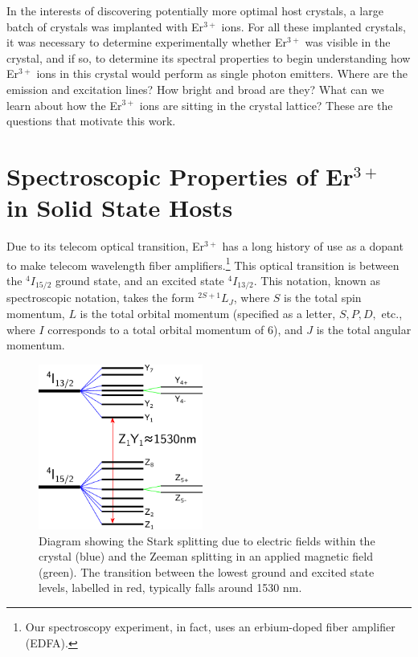 \documentclass[12pt]{puthesis}
\newcommand{\erbium}[1][ ]{Er$^{3+}$#1}
\begin{document}
In the interests of discovering potentially more optimal host crystals, a large batch of crystals was implanted with \erbium ions. For all these implanted crystals, it was necessary to determine experimentally whether \erbium was visible in the crystal, and if so, to determine its spectral properties to begin understanding how \erbium ions in this crystal would perform as single photon emitters. Where are the emission and excitation lines? How bright and broad are they? What can we learn about how the \erbium ions are sitting in the crystal lattice? These are the questions that motivate this work.

\section{Spectroscopic Properties of \erbium in Solid State Hosts}
\label{sec:spectr-prop-erbi}

Due to its telecom optical transition, \erbium has a long history of use as a dopant to make telecom wavelength fiber amplifiers.\footnote{Our spectroscopy experiment, in fact, uses an erbium-doped fiber amplifier (EDFA).} This optical transition is between the $^{4}I_{15/2}$ ground state, and an excited state $^{4}I_{13/2}$. This notation, known as spectroscopic notation, takes the form $^{2S+1}L_{J}$, where $S$ is the total spin momentum, $L$ is the total orbital momentum (specified as a letter, $S, P, D,$ etc., where $I$ corresponds to a total orbital momentum of 6), and $J$ is the total angular momentum. 

\begin{figure}
  \centering
  \includegraphics[width=0.48\textwidth]{EnergyLevelDiagram}
  \caption{Diagram showing the Stark splitting due to electric fields within the crystal (blue) and the Zeeman splitting in an applied magnetic field (green). The transition between the lowest ground and excited state levels, labelled in red, typically falls around 1530 nm.}
  \label{fig:energyleveldiagram}
\end{figure}
\end{document}
